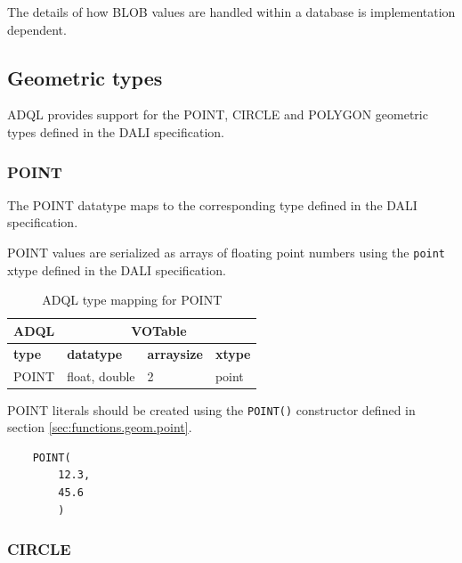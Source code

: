 \documentclass[11pt,a4paper]{ivoa}
\newcommand{\DALIspec} {DALI specification\xspace}
\begin{document}
The details of how BLOB values are handled within a
database is implementation dependent.

\subsection{Geometric types}
\label{sec:types.geom}

ADQL provides support for the POINT, CIRCLE and POLYGON geometric
types defined in the \DALIspec.

\subsubsection{POINT}
\label{sec:types.geom.point}

The POINT datatype maps to the corresponding type defined in the
\DALIspec.

POINT values are serialized as arrays of floating point numbers
using the \verb:point: xtype defined in the \DALIspec.

\begin{table}[thm]\footnotesize
    \begin{tabular}
        {|p{}|p{}|p{}|p{}|}
        \hline

        \hline
        \multicolumn{1}{|c|}{\textbf{ADQL}} &
        \multicolumn{3}{|c|}{\textbf{VOTable}}
        \tabularnewline
        
        \hline
        \textbf{type} &
        \textbf{datatype} &
        \textbf{arraysize} &
        \textbf{xtype}
        \tabularnewline

        \hline
        POINT &
        float, double &
        2 &
        point
        \tabularnewline

        \hline
    \end{tabular}
    \caption{ADQL type mapping for POINT}
    \label{table:types.geom.point}
\end{table}

POINT literals should be created using the \verb:POINT():
constructor defined in section \ref{sec:functions.geom.point}.

\begin{verbatim}
    POINT(
        12.3,
        45.6
        )
\end{verbatim}


\subsubsection{CIRCLE}
\label{sec:types.geom.circle}
\end{document}
